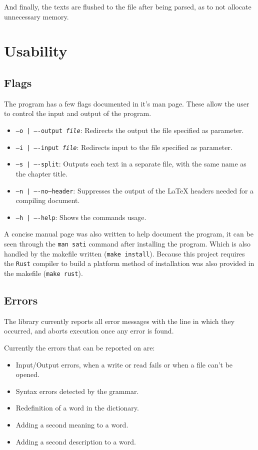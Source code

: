\documentclass[a4paper]{report}
\begin{document}
And finally, the texts are flushed to the file after being parsed, as to not
allocate unnecessary memory.

\chapter{Usability}\label{cha:flags}

\section{Flags}

The program has a few flags documented in it's man page. These allow the user
to control the input and output of the program.

\begin{itemize}
    \item \texttt{--o | ----output \textit{file}}: Redirects the output the file
        specified as parameter.
    \item \texttt{--i | ----input \textit{file}}: Redirects input to the file
        specified as parameter.
    \item \texttt{--s | ----split}: Outputs each text in a separate file, with
        the same name as the chapter title.
    \item \texttt{--n | ----no--header}: Suppresses the output of the \LaTeX{}
        headers needed for a compiling document.
    \item \texttt{--h | ----help}: Shows the commands usage.
\end{itemize}

A concise manual page was also written to help document the program, it can be seen
through the \texttt{man sati} command after installing the program. Which is
also handled by the makefile written (\texttt{make install}). Because this
project requires the \texttt{Rust} compiler to build a platform method of
installation was also provided in the makefile (\texttt{make rust}).

\section{Errors}

The library currently reports all error messages with the line in which they
occurred, and aborts execution once any error is found.

Currently the errors that can be reported on are:

\begin{itemize}
    \item Input/Output errors, when a write or read fails or when a file can't
        be opened.
    \item Syntax errors detected by the grammar.
    \item Redefinition of a word in the dictionary.
    \item Adding a second meaning to a word.
    \item Adding a second description to a word.
\end{itemize}
\end{document}
